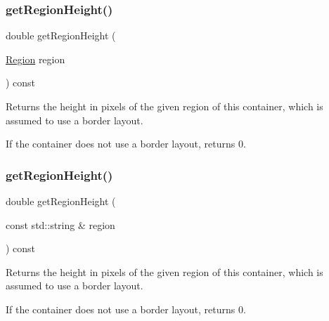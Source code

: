 \mbox{\label{classGContainer_a164d248057318961e7f2abc8c3477d63}} 
\subsubsection{\texorpdfstring{get\+Region\+Height()}{getRegionHeight()}\hspace{0.1cm}{\footnotesize\ttfamily [1/2]}}
{\footnotesize\ttfamily double get\+Region\+Height (\begin{DoxyParamCaption}\item[{\mbox{\hyperlink{classGContainer_a81a01a86de31071a92e6cce0bab9bc4b}{Region}}}]{region }\end{DoxyParamCaption}) const\hspace{0.3cm}{\ttfamily [virtual]}}



Returns the height in pixels of the given region of this container, which is assumed to use a border layout. 

If the container does not use a border layout, returns 0. \mbox{\label{classGContainer_ae8a545e772745b89edaf9804a2dc0057}} 
\subsubsection{\texorpdfstring{get\+Region\+Height()}{getRegionHeight()}\hspace{0.1cm}{\footnotesize\ttfamily [2/2]}}
{\footnotesize\ttfamily double get\+Region\+Height (\begin{DoxyParamCaption}\item[{const std\+::string \&}]{region }\end{DoxyParamCaption}) const\hspace{0.3cm}{\ttfamily [virtual]}}



Returns the height in pixels of the given region of this container, which is assumed to use a border layout. 

If the container does not use a border layout, returns 0. \mbox{\label{classGContainer_a3b5db9ffbd4b32260f80634f162dba4e}} 
